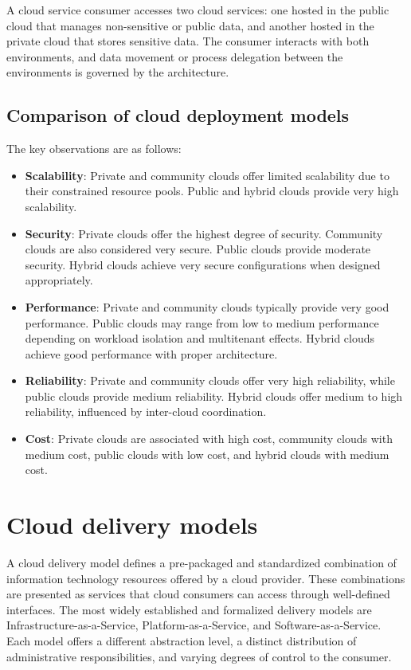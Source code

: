 \documentclass[11pt,a4paper,openany]{report}
\begin{document}
A cloud service consumer accesses two cloud services: one hosted in the public cloud that manages non-sensitive or public data, and another hosted in the private cloud that stores sensitive data. The consumer interacts with both environments, and data movement or process delegation between the environments is governed by the architecture.

\subsection{Comparison of cloud deployment models}

The key observations are as follows:

\begin{itemize}
\item \textbf{Scalability}: Private and community clouds offer limited scalability due to their constrained resource pools. Public and hybrid clouds provide very high scalability.
\item \textbf{Security}: Private clouds offer the highest degree of security. Community clouds are also considered very secure. Public clouds provide moderate security. Hybrid clouds achieve very secure configurations when designed appropriately.
\item \textbf{Performance}: Private and community clouds typically provide very good performance. Public clouds may range from low to medium performance depending on workload isolation and multitenant effects. Hybrid clouds achieve good performance with proper architecture.
\item \textbf{Reliability}: Private and community clouds offer very high reliability, while public clouds provide medium reliability. Hybrid clouds offer medium to high reliability, influenced by inter-cloud coordination.
\item \textbf{Cost}: Private clouds are associated with high cost, community clouds with medium cost, public clouds with low cost, and hybrid clouds with medium cost.
\end{itemize}

\section{Cloud delivery models}

A cloud delivery model defines a pre-packaged and standardized combination of information technology resources offered by a cloud provider. These combinations are presented as services that cloud consumers can access through well-defined interfaces. The most widely established and formalized delivery models are Infrastructure-as-a-Service, Platform-as-a-Service, and Software-as-a-Service. Each model offers a different abstraction level, a distinct distribution of administrative responsibilities, and varying degrees of control to the consumer.
\end{document}
